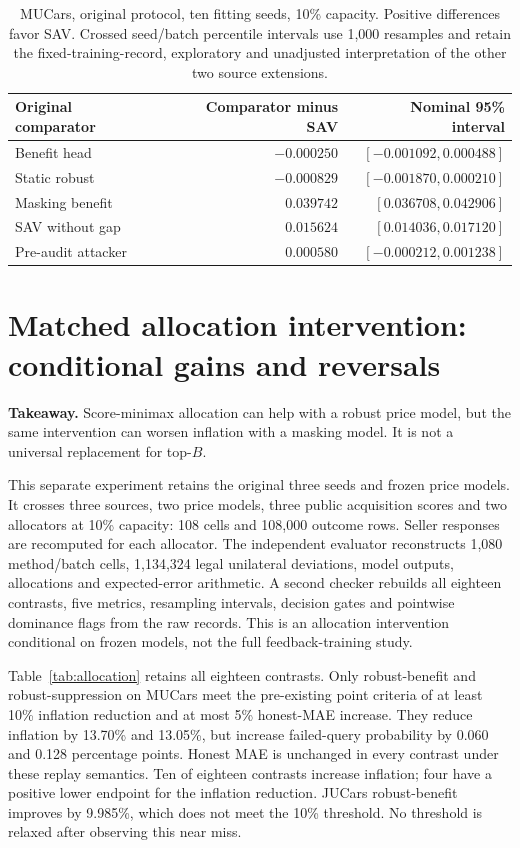 \documentclass[11pt]{article}
\begin{document}
\begin{table}[htbp]
\centering\small
\begin{tabular}{lrr}
\toprule Original comparator & Comparator minus SAV & Nominal 95\% interval\\
\midrule
Benefit head & $-0.000250$ & $[-0.001092,0.000488]$\\
Static robust & $-0.000829$ & $[-0.001870,0.000210]$\\
Masking benefit & $0.039742$ & $[0.036708,0.042906]$\\
SAV without gap & $0.015624$ & $[0.014036,0.017120]$\\
Pre-audit attacker & $0.000580$ & $[-0.000212,0.001238]$\\
\bottomrule
\end{tabular}
\caption{MUCars, original protocol, ten fitting seeds, 10\% capacity.
Positive differences favor SAV. Crossed seed/batch percentile intervals use
1,000 resamples and retain the fixed-training-record, exploratory and
unadjusted interpretation of the other two source extensions.}
\end{table}

\section{Matched allocation intervention: conditional gains and reversals}
\noindent\textbf{Takeaway.} Score-minimax allocation can help with a robust
price model, but the same intervention can worsen inflation with a masking
model. It is not a universal replacement for top-$B$.

This separate experiment retains the original three seeds and frozen price
models. It crosses three sources, two price models, three public acquisition
scores and two allocators at 10\% capacity: 108 cells and 108,000 outcome rows.
Seller responses are recomputed for each allocator. The independent evaluator
reconstructs 1,080 method/batch cells, 1,134,324 legal unilateral deviations,
model outputs, allocations and expected-error arithmetic. A second checker
rebuilds all eighteen contrasts, five metrics, resampling intervals, decision
gates and pointwise dominance flags from the raw records. This is an allocation
intervention conditional on frozen models, not the full feedback-training study.

Table~\ref{tab:allocation} retains all eighteen contrasts. Only robust-benefit
and robust-suppression on MUCars meet the pre-existing point criteria of at
least 10\% inflation reduction and at most 5\% honest-MAE increase. They reduce
inflation by 13.70\% and 13.05\%, but increase failed-query probability by
0.060 and 0.128 percentage points. Honest MAE is unchanged in every contrast
under these replay semantics. Ten of eighteen contrasts increase inflation;
four have a positive lower endpoint for the inflation reduction. JUCars
robust-benefit improves by 9.985\%, which does not meet the 10\% threshold.
No threshold is relaxed after observing this near miss.
\end{document}
